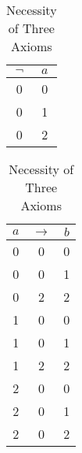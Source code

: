 \begin{table}[!b]
    \caption{Necessity of Three Axioms
        \label{table-showing-necessity-of-three-axioms}}
    \centering
    \begin{tabular}{c|c}
        $\neg$ &  $a$ \\
        \hline
        0 & 0 \\
        0 & 1 \\
        0 & 2 \\
    \end{tabular}

    \begin{tabular}{c | c | c}
            $a$ &   $\to$   & $b$ \\
            \hline
            0  &   0   &  0  \\
            0  &   0   &  1  \\
            0  &   2   &  2  \\
            1  &   0   &  0  \\
            1  &   0   &  1  \\
            1  &   2   &  2  \\
            2  &   0   &  0  \\
            2  &   0   &  1  \\
            2  &   0   &  2  \\
    \end{tabular}
\end{table}
